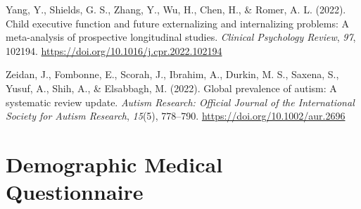\documentclass[
  letterpaper,
]{ut-thesis}
\newlength{\cslhangindent}
\newenvironment{CSLReferences}[2] %
 {\begin{list}{}{%
  \setlength{\itemindent}{0pt}
  \setlength{\leftmargin}{0pt}
  \setlength{\parsep}{0pt}
  \ifodd #1
   \setlength{\leftmargin}{\cslhangindent}
   \setlength{\itemindent}{-1\cslhangindent}
  \fi
  \setlength{\itemsep}{#2\baselineskip}}}
 {\end{list}}
\begin{document}
\begin{CSLReferences}{1}{0}
Yang, Y., Shields, G. S., Zhang, Y., Wu, H., Chen, H., \& Romer, A. L.
(2022). Child executive function and future externalizing and
internalizing problems: {A} meta-analysis of prospective longitudinal
studies. \emph{Clinical Psychology Review}, \emph{97}, 102194.
\url{https://doi.org/10.1016/j.cpr.2022.102194}

Zeidan, J., Fombonne, E., Scorah, J., Ibrahim, A., Durkin, M. S.,
Saxena, S., Yusuf, A., Shih, A., \& Elsabbagh, M. (2022). Global
prevalence of autism: {A} systematic review update. \emph{Autism
Research: Official Journal of the International Society for Autism
Research}, \emph{15}(5), 778--790.
\url{https://doi.org/10.1002/aur.2696}

\end{CSLReferences}

\cleardoublepage
{}
{}
\appendix

\chapter{Demographic Medical Questionnaire}\label{sec-apxdmq}



\end{document}
